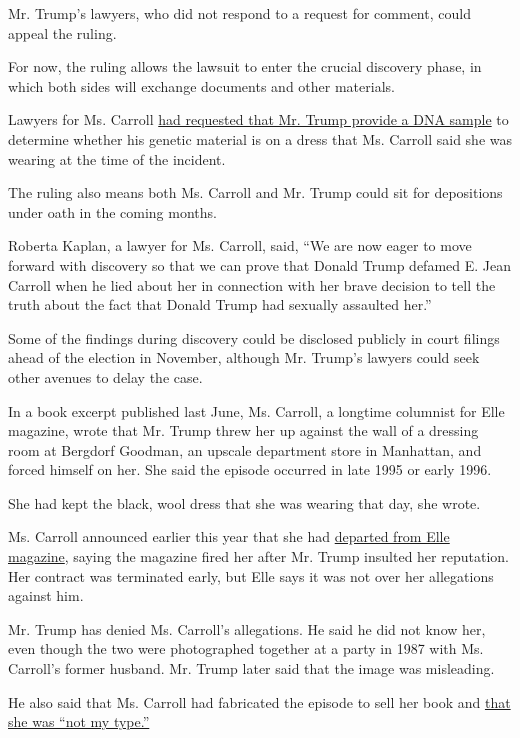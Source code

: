 Mr. Trump's lawyers, who did not respond to a request for comment, could
appeal the ruling.

For now, the ruling allows the lawsuit to enter the crucial discovery
phase, in which both sides will exchange documents and other materials.

Lawyers for Ms. Carroll
\href{https://www.nytimes.com/2020/01/30/nyregion/e-jean-carroll-trump-dna.html}{had
requested that Mr. Trump provide a DNA sample} to determine whether his
genetic material is on a dress that Ms. Carroll said she was wearing at
the time of the incident.

The ruling also means both Ms. Carroll and Mr. Trump could sit for
depositions under oath in the coming months.

Roberta Kaplan, a lawyer for Ms. Carroll, said, ``We are now eager to
move forward with discovery so that we can prove that Donald Trump
defamed E. Jean Carroll when he lied about her in connection with her
brave decision to tell the truth about the fact that Donald Trump had
sexually assaulted her.''

Some of the findings during discovery could be disclosed publicly in
court filings ahead of the election in November, although Mr. Trump's
lawyers could seek other avenues to delay the case.

In a book excerpt published last June, Ms. Carroll, a longtime columnist
for Elle magazine, wrote that Mr. Trump threw her up against the wall of
a dressing room at Bergdorf Goodman, an upscale department store in
Manhattan, and forced himself on her. She said the episode occurred in
late 1995 or early 1996.

She had kept the black, wool dress that she was wearing that day, she
wrote.

Ms. Carroll announced earlier this year that she had
\href{https://www.nytimes.com/2020/02/19/business/media/e-jean-carroll-elle.html}{departed
from Elle magazine}, saying the magazine fired her after Mr. Trump
insulted her reputation. Her contract was terminated early, but Elle
says it was not over her allegations against him.

Mr. Trump has denied Ms. Carroll's allegations. He said he did not know
her, even though the two were photographed together at a party in 1987
with Ms. Carroll's former husband. Mr. Trump later said that the image
was misleading.

He also said that Ms. Carroll had fabricated the episode to sell her
book and
\href{https://www.nytimes.com/2019/06/24/us/politics/jean-carroll-trump.html}{that
she was ``not my type.''}

